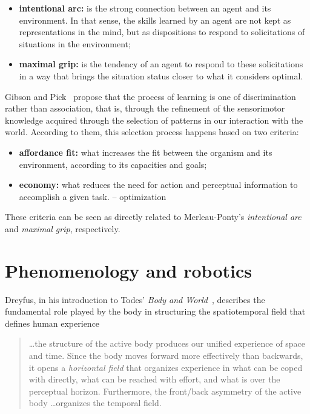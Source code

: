 \documentclass{article}
\begin{document}
\begin{itemize}
\item \textbf{intentional arc:} is the strong connection between an agent and
its environment. In that sense, the skills learned by an agent are not kept as
representations in the mind, but as dispositions to respond to solicitations of
situations in the environment;
\item \textbf{maximal grip:} is the tendency of an agent to respond to these
solicitations in a way that brings the situation status closer to what it
considers optimal.
\end{itemize}

Gibson and Pick~\cite{gibson2000} propose that the process of learning is one of
discrimination rather than association, that is, through the refinement of the
sensorimotor knowledge acquired through the selection of patterns in our
interaction with the world. According to them, this selection process happens
based on two criteria:


\begin{itemize}
\item \textbf{affordance fit:} what increases the fit between the organism and
its environment, according to its capacities and goals;
\item \textbf{economy:} what reduces the need for action and perceptual
information to accomplish a given task. -- optimization
\end{itemize}

These criteria can be seen as directly related to Merleau-Ponty's
\emph{intentional arc} and \emph{maximal grip}, respectively.


\section{Phenomenology and robotics}


Dreyfus, in his introduction to Todes' \emph{Body and World}~\cite{todes2001},
describes the fundamental role played by the body in structuring the
spatiotemporal field that defines human experience

\begin{quotation}
  \dots the structure of the active body produces our unified experience of
  space and time. Since the body moves forward more effectively than backwards,
  it opens a \emph{horizontal field} that organizes experience in what can be
  coped with directly, what can be reached with effort, and what is over the
  perceptual horizon. Furthermore, the front/back asymmetry of the active body
  \dots organizes the temporal field.
\end{quotation}
\end{document}
